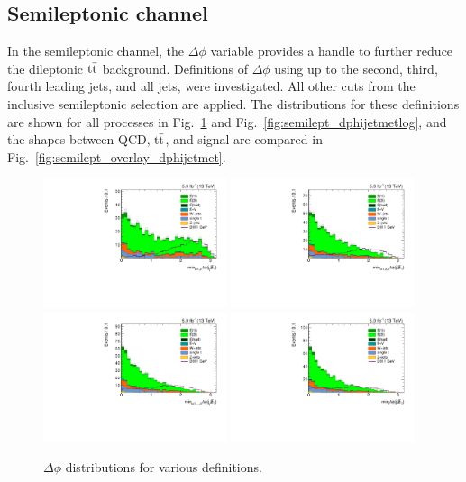 \subsection{Semileptonic channel}
In the semileptonic channel, the $\Delta\phi$ variable provides a handle to further reduce the dileptonic $\mathrm{t}\bar{\mathrm{t}}$ background. Definitions of $\Delta\phi$ using up to the second, third, fourth leading jets, and all jets, were investigated. All other cuts from the inclusive semileptonic selection are applied. The distributions for these definitions are shown for all processes in Fig.~\ref{fig:semilept_dphijetmet} and Fig.~\ref{fig:semilept_dphijetmetlog}, and the shapes between QCD, $\mathrm{t}\bar{\mathrm{t}}$, and signal are compared in Fig.~\ref{fig:semilept_overlay_dphijetmet}.

\begin{figure}[htbp]
  \centering
  \includegraphics[width=0.48\textwidth]{figures/semilept-incl-dphijetmet2_l.pdf}
  \includegraphics[width=0.48\textwidth]{figures/semilept-incl-dphijetmet3_l.pdf} \\
  \includegraphics[width=0.48\textwidth]{figures/semilept-incl-dphijetmet4_l.pdf}
  \includegraphics[width=0.48\textwidth]{figures/semilept-incl-dphijetmet_l.pdf}
  \caption{$\Delta\phi$ distributions for various definitions.}
  \label{fig:semilept_dphijetmet}
\end{figure}

